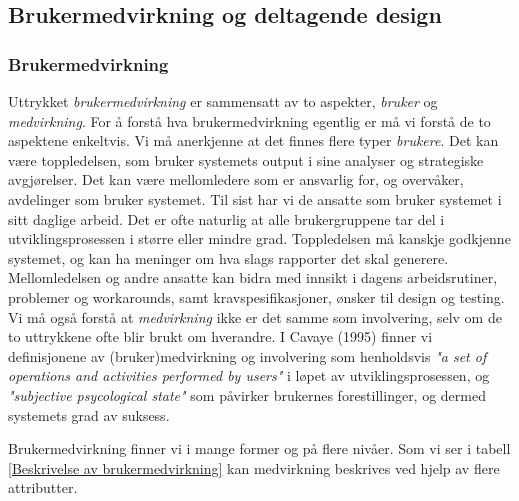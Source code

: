 \subsection{Brukermedvirkning og deltagende design}
\label{chp: medvirkning}

\subsubsection{Brukermedvirkning}
Uttrykket \emph{brukermedvirkning} er sammensatt av to aspekter, \emph{bruker} og \emph{medvirkning}. For å forstå hva brukermedvirkning egentlig er må vi forstå de to aspektene enkeltvis. Vi må anerkjenne at det finnes flere typer \emph{brukere}. Det kan være toppledelsen, som bruker systemets output i sine analyser og strategiske avgjørelser. Det kan være mellomledere som er ansvarlig for, og overvåker, avdelinger som bruker systemet. Til sist har vi de ansatte som bruker systemet i sitt daglige arbeid. Det er ofte naturlig at alle brukergruppene tar del i utviklingsprosessen i større eller mindre grad. Toppledelsen må kanskje godkjenne systemet, og kan ha meninger om hva slags rapporter det skal generere. Mellomledelsen og andre ansatte kan bidra med innsikt i dagens arbeidsrutiner, problemer og workarounds, samt kravspesifikasjoner, ønsker til design og testing. Vi må også forstå at \emph{medvirkning} ikke er det samme som involvering, selv om de to uttrykkene ofte blir brukt om hverandre. I Cavaye (1995) finner vi definisjonene av (bruker)medvirkning og involvering som henholdsvis \emph{"a set of operations and activities performed by users"} i løpet av utviklingsprosessen, og \emph{"subjective psycological state"} som påvirker brukernes forestillinger, og dermed systemets grad av suksess.

\noindent
Brukermedvirkning finner vi i mange former og på flere nivåer. Som vi ser i tabell \ref{Beskrivelse av brukermedvirkning} kan medvirkning beskrives ved hjelp av flere attributter. 

